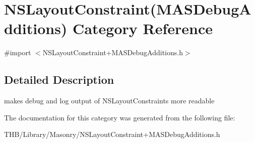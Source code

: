 \hypertarget{category_n_s_layout_constraint_07_m_a_s_debug_additions_08}{}\section{N\+S\+Layout\+Constraint(M\+A\+S\+Debug\+Additions) Category Reference}
\label{category_n_s_layout_constraint_07_m_a_s_debug_additions_08}


{\ttfamily \#import $<$N\+S\+Layout\+Constraint+\+M\+A\+S\+Debug\+Additions.\+h$>$}



\subsection{Detailed Description}
makes debug and log output of N\+S\+Layout\+Constraints more readable 

The documentation for this category was generated from the following file\+:\begin{DoxyCompactItemize}
\item 
T\+H\+B/\+Library/\+Masonry/N\+S\+Layout\+Constraint+\+M\+A\+S\+Debug\+Additions.\+h\end{DoxyCompactItemize}
